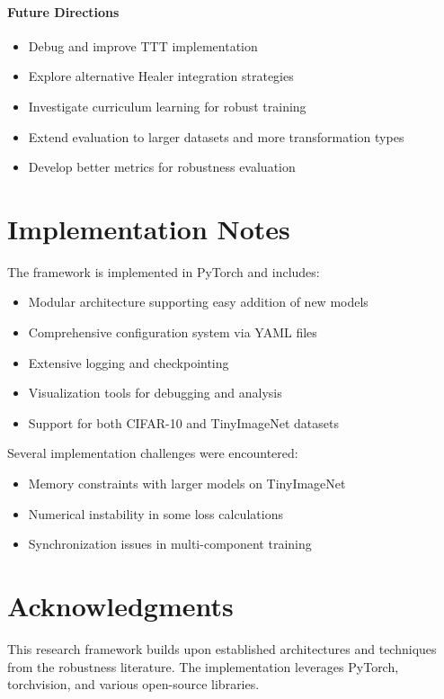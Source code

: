 \documentclass[11pt,a4paper]{article}
\begin{document}
\paragraph{Future Directions}
\begin{itemize}
    \item Debug and improve TTT implementation
    \item Explore alternative Healer integration strategies
    \item Investigate curriculum learning for robust training
    \item Extend evaluation to larger datasets and more transformation types
    \item Develop better metrics for robustness evaluation
\end{itemize}

\section{Implementation Notes}

The framework is implemented in PyTorch and includes:
\begin{itemize}
    \item Modular architecture supporting easy addition of new models
    \item Comprehensive configuration system via YAML files
    \item Extensive logging and checkpointing
    \item Visualization tools for debugging and analysis
    \item Support for both CIFAR-10 and TinyImageNet datasets
\end{itemize}

Several implementation challenges were encountered:
\begin{itemize}
    \item Memory constraints with larger models on TinyImageNet
    \item Numerical instability in some loss calculations
    \item Synchronization issues in multi-component training
\end{itemize}

\section{Acknowledgments}

This research framework builds upon established architectures and techniques from the robustness literature. The implementation leverages PyTorch, torchvision, and various open-source libraries.
\end{document}
